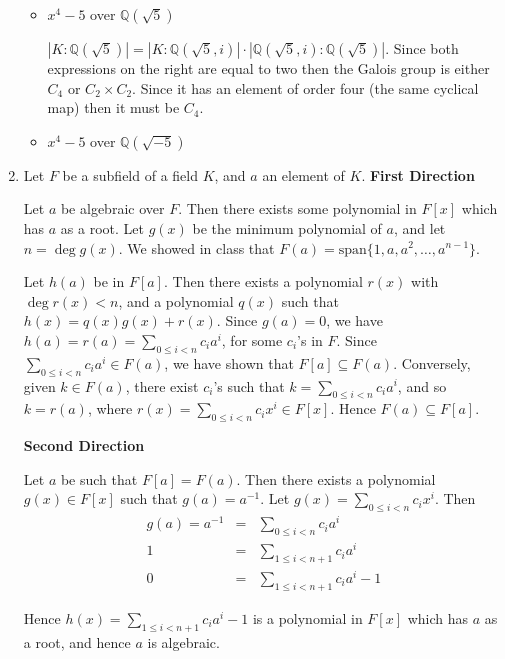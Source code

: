 \documentclass[11pt]{article} \usepackage{amssymb}
\newcommand{\Q}{\mathbb Q}
\begin{document}
\begin{enumerate}
\begin{itemize}
    \item $x^4-5$ over $\Q(\sqrt{5})$
      
      $|K:\Q(\sqrt{5})|=|K:\Q(\sqrt{5},i)|\cdot|\Q(\sqrt{5},i):\Q(\sqrt{5})|$.
      Since both expressions on the right are equal to two then the Galois
      group is either $C_4$ or $C_2\times C_2$. Since it has an element of order four 
      (the same cyclical map) then it must be $C_4$.

    \item $x^4-5$ over $\Q(\sqrt{-5})$

    \end{itemize}  

  \item
    Let $F$ be a subfield of a field $K$, and $a$ an element of $K$.
    {\bf First Direction}

    Let $a$ be algebraic over $F$. Then there exists some polynomial in $F[x]$
    which has $a$ as a root. Let $g(x)$ be the minimum polynomial of $a$, and
    let $n=\deg g(x)$. 
    We showed in class that $F(a)=\mbox{span}\{1, a, a^2, \ldots, a^{n-1}\}$. 
    
    Let $h(a)$ be in $F[a]$. 
    Then there exists a polynomial
    $r(x)$ with $\deg r(x) < n$, and a polynomial $q(x)$ such that 
    $h(x)=q(x)g(x)+r(x)$. Since $g(a)=0$, we have 
    $h(a)=r(a)=\sum_{0\leq i <n}c_ia^i$, for some $c_i$'s in $F$. Since
    $\sum_{0\leq i <n}c_ia^i \in F(a)$, we have shown that $F[a] \subseteq F(a)$. 
    Conversely, given $k \in F(a)$, there exist $c_i$'s such that $k=\sum_{0\leq i <n}c_ia^i$,
    and so $k=r(a)$, where $r(x)=\sum_{0\leq i <n}c_ix^i \in F[x]$. 
    Hence $F(a) \subseteq F[a]$.

    {\bf Second Direction}

    Let $a$ be such that $F[a]=F(a)$. Then there exists a polynomial 
    $g(x) \in F[x]$ such that $g(a)=a^{-1}$. Let $g(x)=\sum_{0\leq i < n}c_ix^i$. Then
    \begin{eqnarray*}
      g(a)=a^{-1}&=&\sum_{0\leq i < n}c_ia^i
      \\ 1 &=& \sum_{1\leq i < n + 1}c_ia^i
      \\ 0 &=& \sum_{1\leq i < n + 1}c_ia^i - 1
    \end{eqnarray*}
    
    Hence $h(x)=\sum_{1\leq i < n + 1}c_ia^i - 1$ is a polynomial in $F[x]$ which
    has $a$ as a root, and hence $a$ is algebraic.

\end{enumerate}
\end{document}
